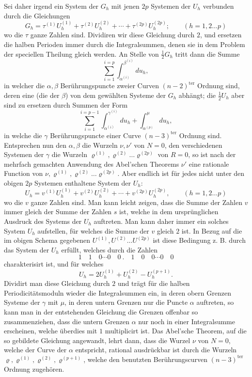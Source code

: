 \documentclass[10pt]{article}
\begin{document}
Sei daher irgend ein System der \(G_h\) mit jenen \(2p\) Systemen der \(U_h\) verbunden durch die Gleichungen
\[
G_h=\tau^{(1)}U_h^{(1)}+\tau^{(2)}U_h^{(2)}
+\cdots+\tau^{(2p)}U_h^{(2p)};
\qquad (h=1,2\ldots p)
\]
wo die \(\tau\) ganze Zahlen sind. Dividiren wir diese Gleichung durch \(2\), und ersetzen die halben Perioden immer durch die Integralsummen, denen sie in dem Problem der speciellen Theilung gleich werden. An Stelle von \(\frac12G_h\) tritt dann die Summe
\[
\sum_{i=1}^{i=p}\int_{\alpha^{(i)}}^{\beta^{(i)}}du_h,
\]
in welcher die \(\alpha,\beta\) Berührungspuncte zweier Curven \((n-2)^{\text{ter}}\) Ordnung sind, deren eine (die der \(\beta\)) von dem gewählten Systeme der \(G_h\) abhängt; die \(\frac12U_h\) aber sind zu ersetzen durch Summen der Form
\[
\sum_{i=1}^{i=p-1}\int_{\alpha^{(i)}}^{\gamma^{(i)}}du_h
+\int_{\alpha^{(p)}}^{\mu}du_h,
\]
in welche die \(\gamma\) Berührungspuncte einer Curve \((n-3)^{\text{ter}}\) Ordnung sind. Entsprechen nun den \(\alpha,\beta\) die Wurzeln \(\nu,\nu'\) von \(N=0\), den verschiedenen Systemen der \(\gamma\) die Wurzeln \(\varrho^{(1)},\varrho^{(2)}\ldots\varrho^{(2p)}\) von \(R=0\), so ist nach der mehrfach gemachten Anwendung des Abel'schen Theorems \(\nu'\) eine rationale Function von \(\nu,\varrho^{(1)},\varrho^{(2)}\ldots\varrho^{(2p)}\). Aber endlich ist für jedes nicht unter den obigen \(2p\) Systemen enthaltene System der \(U_h\):
\[
U_h=v^{(1)}U_h^{(1)}+v^{(2)}U_h^{(2)}
+\cdots+v^{(2p)}U_h^{(2p)},\qquad (h=1,2\ldots p)
\]
wo die \(v\) ganze Zahlen sind. Man kann leicht zeigen, dass die Summe der Zahlen \(v\) immer gleich der Summe der Zahlen \(s\) ist, welche in dem ursprünglichen Ausdruck des Systems der \(U_h\) auftreten. Man kann daher immer ein solches System \(U_h\) aufstellen, für welches die Summe der \(v\) gleich \(2\) ist. In Bezug auf die im obigen Schema gegebenen \(U^{(1)},U^{(2)}\ldots U^{(2p)}\) ist diese Bedingung z. B. durch das System der \(U_h\) erfüllt, welches durch die Zahlen
\[
1\quad1\quad0\cdots0\quad0\ .\quad1\quad0\quad0\cdots0\quad0
\]
charakterisirt ist, und für welches
\[
U_h=2U_h^{(1)}+U_h^{(2)}-U_h^{(p+1)}.
\]
Dividirt man diese Gleichung durch \(2\) und trägt für die halben Periodicitätsmoduln wieder die Integralsummen ein, in deren obern Grenzen Systeme der \(\gamma\) mit \(\mu\), in deren untern Grenzen nur die Puncte \(\alpha\) auftreten, so kann man in der entstehenden Gleichung die Grenzen offenbar so zusammenziehen, dass die untern Grenzen \(\alpha\) nur noch in einer Integralsumme erscheinen, welche überdies mit \(1\) multiplicirt ist. Das Abel'sche Theorem, auf die so gebildete Gleichung angewandt, lehrt dann, dass die Wurzel \(\nu\) von \(N=0\), welche der Curve der \(\alpha\) entspricht, rational ausdrückbar ist durch die Wurzeln \(\varrho,\varrho^{(1)},\varrho^{(2)},\varrho^{(p+1)}\), welche den benutzten Berührungscurven \((n-3)^{\text{ter}}\) Ordnung zugehören.
\end{document}
